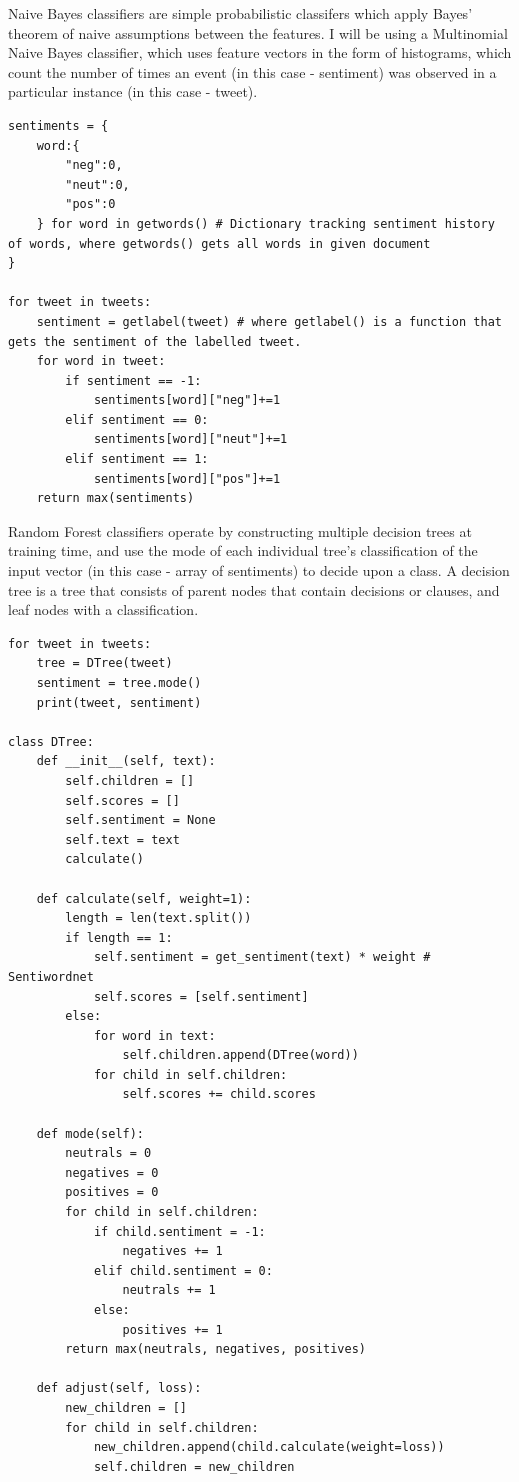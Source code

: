 \documentclass{article}
\begin{document}
Naive Bayes classifiers are simple probabilistic classifers which apply Bayes' theorem of naive assumptions between the features.
I will be using a Multinomial Naive Bayes classifier, which uses feature vectors in the form of histograms, which count the number of times an event (in this case - sentiment) was observed in a particular instance (in this case - tweet)\autocite[4]{nbc}.

\begin{lstlisting}[caption={Multinomial Naive Bayes classifier psuedopythoncode},captionpos=b]
sentiments = {
	word:{
		"neg":0,
		"neut":0,
		"pos":0
	} for word in getwords() # Dictionary tracking sentiment history of words, where getwords() gets all words in given document
}

for tweet in tweets:
	sentiment = getlabel(tweet) # where getlabel() is a function that gets the sentiment of the labelled tweet.
	for word in tweet:
		if sentiment == -1:
			sentiments[word]["neg"]+=1
		elif sentiment == 0:
			sentiments[word]["neut"]+=1
		elif sentiment == 1:
			sentiments[word]["pos"]+=1
	return max(sentiments)
\end{lstlisting}

Random Forest classifiers operate by constructing multiple decision trees at training time, and use the mode of each individual tree's classification of the input vector (in this case - array of sentiments) to decide upon a class.
A decision tree is a tree that consists of parent nodes that contain decisions or clauses, and leaf nodes with a classification\autocite[4]{rf}.

\begin{lstlisting}[caption={Random Forest classifier psuedopythoncode},captionpos=b]
for tweet in tweets:
	tree = DTree(tweet)
	sentiment = tree.mode()
	print(tweet, sentiment)

class DTree:
	def __init__(self, text):
		self.children = []
		self.scores = []
		self.sentiment = None
		self.text = text
		calculate()

	def calculate(self, weight=1):
		length = len(text.split())
		if length == 1:
			self.sentiment = get_sentiment(text) * weight # Sentiwordnet
			self.scores = [self.sentiment]
		else:
			for word in text:
				self.children.append(DTree(word))
			for child in self.children:
				self.scores += child.scores

	def mode(self):
		neutrals = 0
		negatives = 0
		positives = 0
		for child in self.children:
			if child.sentiment = -1:
				negatives += 1
			elif child.sentiment = 0:
				neutrals += 1
			else:
				positives += 1
		return max(neutrals, negatives, positives)

	def adjust(self, loss):
		new_children = []
		for child in self.children:
			new_children.append(child.calculate(weight=loss))
			self.children = new_children
\end{lstlisting}
\end{document}
